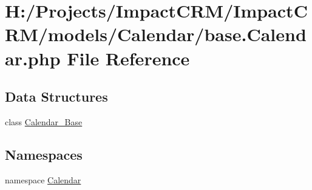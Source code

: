 \hypertarget{base_8Calendar_8php}{
\section{H:/Projects/ImpactCRM/ImpactCRM/models/Calendar/base.Calendar.php File Reference}
\label{base_8Calendar_8php}
}
\subsection*{Data Structures}
\begin{DoxyCompactItemize}
\item 
class \hyperlink{classCalendar__Base}{Calendar\_\-Base}
\end{DoxyCompactItemize}
\subsection*{Namespaces}
\begin{DoxyCompactItemize}
\item 
namespace \hyperlink{namespaceCalendar}{Calendar}
\end{DoxyCompactItemize}
